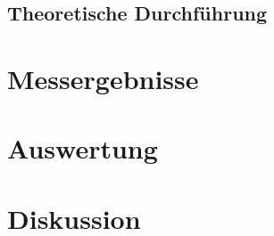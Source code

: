 \documentclass[12pt]{scrartcl}
\begin{document}
\subsection{Theoretische Durchführung}


\section{Messergebnisse}



\section{Auswertung}


\section{Diskussion}


\end{document}
